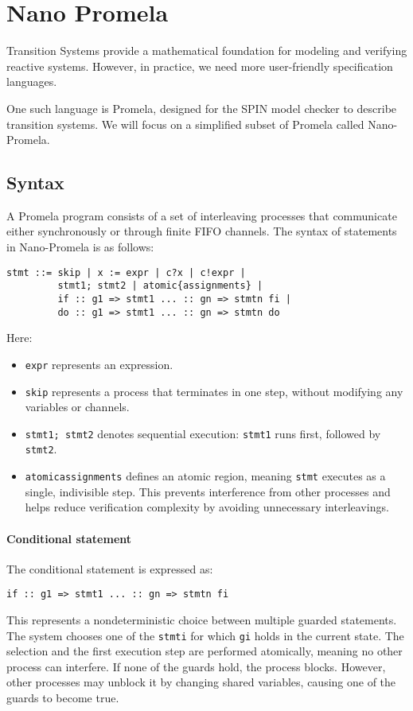 \section{Nano Promela}

Transition Systems provide a mathematical foundation for modeling and verifying reactive systems. 
However, in practice, we need more user-friendly specification languages.

One such language is Promela, designed for the SPIN model checker to describe transition systems. 
We will focus on a simplified subset of Promela called Nano-Promela.

\subsection{Syntax}
A Promela program consists of a set of interleaving processes that communicate either synchronously or through finite FIFO channels.
The syntax of statements in Nano-Promela is as follows:
\begin{verbatim}
stmt ::= skip | x := expr | c?x | c!expr |
         stmt1; stmt2 | atomic{assignments} |
         if :: g1 => stmt1 ... :: gn => stmtn fi |
         do :: g1 => stmt1 ... :: gn => stmtn do
\end{verbatim}
Here: 
\begin{itemize}
    \item \texttt{expr} represents an expression.
    \item \texttt{skip} represents a process that terminates in one step, without modifying any variables or channels.
    \item \texttt{stmt1; stmt2} denotes sequential execution: \texttt{stmt1} runs first, followed by \texttt{stmt2}.
    \item \texttt{atomic{assignments}} defines an atomic region, meaning \texttt{stmt} executes as a single, indivisible step. 
        This prevents interference from other processes and helps reduce verification complexity by avoiding unnecessary interleavings.
\end{itemize}

\paragraph*{Conditional statement}
The conditional statement is expressed as: 
\begin{verbatim}
if :: g1 => stmt1 ... :: gn => stmtn fi
\end{verbatim}
This represents a nondeterministic choice between multiple guarded statements.
The system chooses one of the \texttt{stmti} for which \texttt{gi} holds in the current state.
The selection and the first execution step are performed atomically, meaning no other process can interfere.
If none of the guards hold, the process blocks.
However, other processes may unblock it by changing shared variables, causing one of the guards to become true.

